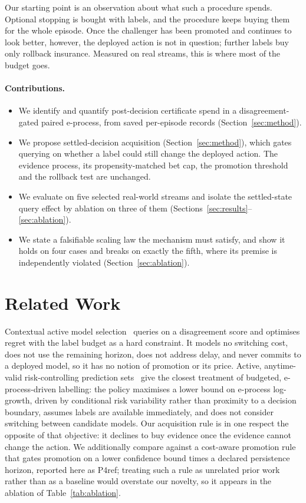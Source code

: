 \documentclass{article}
\begin{document}
Our starting point is an observation about what such a procedure spends. Optional stopping is
bought with labels, and the procedure keeps buying them for the whole episode. Once the challenger
has been promoted and continues to look better, however, the deployed action is not in question;
further labels buy only rollback insurance. Measured on real streams, this is where most of the
budget goes.

\paragraph{Contributions.}
\begin{itemize}
  \item We identify and quantify post-decision certificate spend in a disagreement-gated paired
  e-process, from saved per-episode records (Section~\ref{sec:method}).
  \item We propose settled-decision acquisition (Section~\ref{sec:method}), which gates querying
  on whether a label could still change the deployed action. The evidence process, its
  propensity-matched bet cap, the promotion threshold and the rollback test are unchanged.
  \item We evaluate on five selected real-world streams and isolate the settled-state query effect
  by ablation on three of them (Sections~\ref{sec:results}--\ref{sec:ablation}).
  \item We state a falsifiable scaling law the mechanism must satisfy, and show it holds on four
  cases and breaks on exactly the fifth, where its premise is independently violated
  (Section~\ref{sec:ablation}).
\end{itemize}

\section{Related Work}
Contextual active model selection~\cite{liu2024cams} queries on a disagreement score and optimises
regret with the label budget as a hard constraint. It models no switching cost, does not use the
remaining horizon, does not address delay, and never commits to a deployed model, so it has no
notion of promotion or its price. Active, anytime-valid risk-controlling prediction
sets~\cite{xu2024active} give the closest treatment of budgeted, e-process-driven labelling: the
policy maximises a lower bound on e-process log-growth, driven by conditional risk variability
rather than proximity to a decision boundary, assumes labels are available immediately, and does
not consider switching between candidate models. Our acquisition rule is in one respect the
opposite of that objective: it declines to buy evidence once the evidence cannot change the
action. We additionally compare against a cost-aware promotion rule that gates promotion on a
lower confidence bound times a declared persistence horizon, reported here as \textsf{P4ref};
treating such a rule as unrelated prior work rather than as a baseline would overstate our
novelty, so it appears in the ablation of Table~\ref{tab:ablation}.
\end{document}
